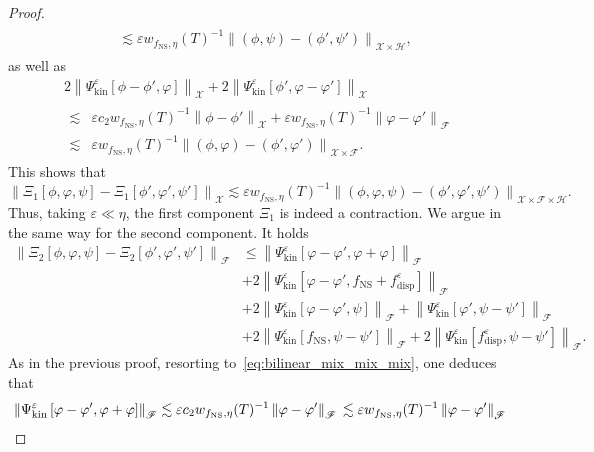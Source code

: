 \documentclass[AHL,Unicode,longabstracts,published]{cedram}
\newcommand{\ns}{\mathrm{NS}}
\newcommand{\kin}{\mathrm{kin}}
\newcommand{\disp}{\mathrm{disp}}
\newcommand{\FFF}{\mathscr{F}}
\newcommand{\HHH}{\mathscr{H}}
\newcommand{\GGG}{\mathscr{X}}
\newcommand{\SSSs}{\HHH}
\newcommand{\SSSl}{\GGG}
\newcommand{\SSSm}{\FFF}
\renewcommand*\le{\leqslant}
\newcommand*\eps{{\varepsilon}}
\begin{document}
\begin{proof}
\begin{multline*}
\begin{aligned}
&\lesssim \eps w_{ f_\ns, \eta }(T)^{-1} \left\| (\phi, \psi) - (\phi', \psi') \right\|_{ \SSSl \times \SSSs },
\end{aligned}
\end{multline*}
as well as
\begin{multline*}
2 \left\| \Psi^\eps_\kin\left[\phi - \phi', \varphi\right] \right\|_{ \SSSl }  + 2 \left\| \Psi^\eps_\kin\left[\phi', \varphi - \varphi'\right] \right\|_{ \SSSl } \\
\begin{aligned}
\lesssim & \eps c_2 w_{ f_\ns, \eta }(T)^{-1} \left\| \phi - \phi' \right\|_{ \SSSl } + \eps w_{ f_\ns, \eta }(T)^{-1} \left\| \varphi - \varphi' \right\|_{ \SSSm } \\
\lesssim & \eps w_{ f_\ns, \eta }(T)^{-1}\left \| (\phi, \varphi) - (\phi', \varphi') \right\|_{ \SSSl \times \SSSm }.
\end{aligned}
\end{multline*}
This shows that
\[
\left\| \Xi_1\left [\phi, \varphi, \psi\right] - \Xi_1\left [\phi', \varphi', \psi'\right] \right\|_{ \SSSl } \lesssim \eps w_{ f_\ns, \eta }(T)^{-1} \left \| (\phi, \varphi, \psi) - (\phi', \varphi', \psi') \right\|_{ \SSSl \times \SSSm \times \SSSs }.
\]
Thus, taking $\eps \ll \eta$, the first component $\Xi_1$ is indeed a contraction. We argue in the same way for the second component. It holds
\begin{align*}
\left\| \Xi_2\left[\phi, \varphi, \psi\right] - \Xi_2\left[\phi', \varphi', \psi'\right] \right\|_{ \SSSm } &\le \left\| \Psi^\eps_\kin\left[\varphi - \varphi', \varphi + \varphi\right] \right\|_{ \SSSm } \\
& + 2 \left\| \Psi^\eps_\kin \left[\varphi - \varphi', f_\ns + f^\eps_\disp\right] \right\|_{ \SSSm } \\
& + 2 \left\| \Psi^\eps_\kin\left[\varphi - \varphi', \psi\right] \right\|_{ \SSSm } + \left\| \Psi^\eps_\kin \left[\varphi', \psi - \psi'\right] \right\|_{ \SSSm } \\
& + 2 \left\| \Psi^\eps_\kin \left[f_\ns, \psi - \psi'\right] \right\|_{ \SSSm } + 2 \left\| \Psi^\eps_\kin\left[f^\eps_\disp, \psi - \psi'\right] \right\|_{ \SSSm }.
\end{align*}
As in the previous proof, resorting to~\eqref{eq:bilinear_mix_mix_mix}, one deduces that
\[
\left\| \Psi^\eps_\kin \left[\varphi - \varphi', \varphi + \varphi\right] \right\|_{ \SSSm } \lesssim \eps c_2 w_{f_\ns, \eta}(T)^{-1} \left\| \varphi - \varphi' \right\|_{\SSSm} \\
\lesssim \eps w_{f_\ns, \eta}(T)^{-1} \left\| \varphi - \varphi' \right\|_{\SSSm}
\]
\end{proof}
\end{document}
